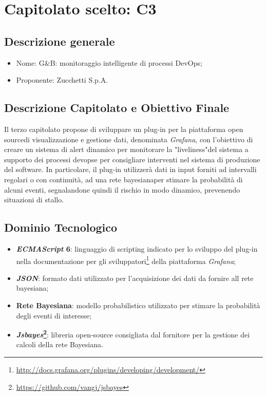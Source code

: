 \section{Capitolato scelto: C3}\label{CapScelto}

\subsection{Descrizione generale}
\begin{itemize}
	\item Nome: G$\&$B: monitoraggio intelligente di processi DevOps;
	\item Proponente: Zucchetti S.p.A.
\end{itemize}

\subsection{Descrizione Capitolato e Obiettivo Finale}
Il terzo capitolato propone di sviluppare un plug-in per la piattaforma open source\glossario di visualizzazione e gestione dati, denominata \textit{Grafana}, con l'obiettivo di creare un sistema di alert dinamico per monitorare la "liveliness"\glossario del sistema a supporto dei processi
devops\glossario e per consigliare interventi nel sistema di produzione del software.
In particolare, il plug-in utilizzerà dati in input forniti ad intervalli regolari o con continuità, ad una rete bayesiana\glossario per stimare la probabilità di alcuni eventi, segnalandone quindi il rischio in modo dinamico, prevenendo situazioni di stallo.   

\subsection{Dominio Tecnologico}
\begin{itemize}
	\item \textbf{\textit{ECMAScript} 6\glossario}: linguaggio di scripting indicato per lo sviluppo del plug-in nella documentazione per gli sviluppatori\footnote{\url{http://docs.grafana.org/plugins/developing/development/}} della piattaforma \textit{Grafana};
	\item \textbf{\textit{JSON}\glossario}: formato dati utilizzato per l'acquisizione dei dati da fornire all rete bayesiana;
	\item \textbf{Rete Bayesiana}: modello probabilistico utilizzato per stimare la probabilità degli eventi di interesse;
	\item \textbf{\textit{Jsbayes}\footnote{\hyperref[Link al repository GitHub]{\url{https://github.com/vangj/jsbayes}}}\glossario}: libreria open-source consigliata dal fornitore per la gestione dei calcoli della rete Bayesiana.
\end{itemize}

